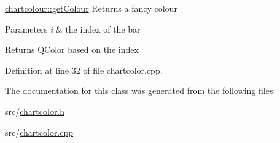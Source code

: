 \hyperlink{classchartcolour_a241179907f02bbf60bb286fa570f6773}{chartcolour\-::get\-Colour} Returns a fancy colour 


\begin{DoxyParams}{Parameters}
{\em i} & the index of the bar \\
\hline
\end{DoxyParams}
\begin{DoxyReturn}{Returns}
Q\-Color based on the index 
\end{DoxyReturn}


Definition at line 32 of file chartcolor.\-cpp.



The documentation for this class was generated from the following files\-:\begin{DoxyCompactItemize}
\item 
src/\hyperlink{chartcolor_8h}{chartcolor.\-h}\item 
src/\hyperlink{chartcolor_8cpp}{chartcolor.\-cpp}\end{DoxyCompactItemize}
